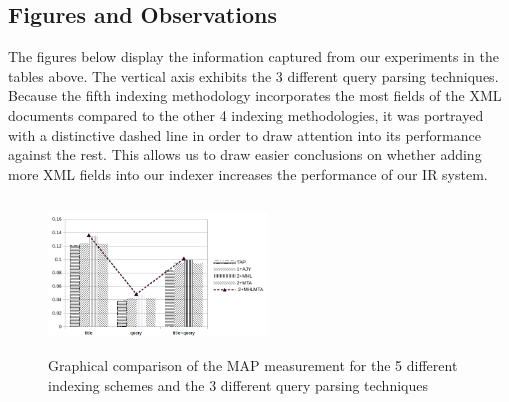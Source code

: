 \subsection{Figures and Observations}

The figures below display the information captured from our experiments in the tables above. The vertical axis exhibits the 3 different query parsing techniques. Because the fifth indexing methodology incorporates the most fields of the XML documents compared to the other 4 indexing methodologies, it was portrayed with a distinctive dashed line in order to draw attention into its performance against the rest. This allows us to draw easier conclusions on whether adding more XML fields into our indexer increases the performance of our IR system.     
\begin{figure}[H]
    \centering 
    \includegraphics[height=4.05cm, width=0.520\textwidth]{map_measurements.png}
    \vspace{-0.75cm}
    \caption{Graphical comparison of the MAP measurement for the 5 different indexing schemes and the 3 different query parsing techniques}
    \label{fig:map}
\end{figure}
\vspace{-0.05cm}


